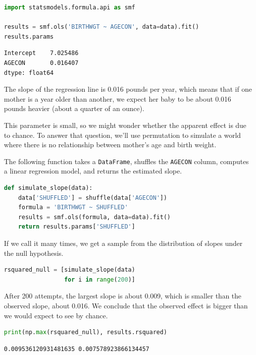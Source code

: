 \begin{lstlisting}[language=Python,style=source]
import statsmodels.formula.api as smf

results = smf.ols('BIRTHWGT ~ AGECON', data=data).fit()
results.params
\end{lstlisting}

\begin{lstlisting}[style=output]
Intercept    7.025486
AGECON       0.016407
dtype: float64
\end{lstlisting}

The slope of the regression line is 0.016 pounds per year, which means
that if one mother is a year older than another, we expect her baby to
be about 0.016 pounds heavier (about a quarter of an ounce).

This parameter is small, so we might wonder whether the apparent effect
is due to chance. To answer that question, we'll use permutation to
simulate a world where there is no relationship between mother's age and
birth weight.

The following function takes a \passthrough{\lstinline!DataFrame!},
shuffles the \passthrough{\lstinline!AGECON!} column, computes a linear
regression model, and returns the estimated slope.

\begin{lstlisting}[language=Python,style=source]
def simulate_slope(data):
    data['SHUFFLED'] = shuffle(data['AGECON'])
    formula = 'BIRTHWGT ~ SHUFFLED'
    results = smf.ols(formula, data=data).fit()
    return results.params['SHUFFLED']
\end{lstlisting}

If we call it many times, we get a sample from the distribution of
slopes under the null hypothesis.

\begin{lstlisting}[language=Python,style=source]
rsquared_null = [simulate_slope(data)
                 for i in range(200)]
\end{lstlisting}

After 200 attempts, the largest slope is about 0.009, which is smaller
than the observed slope, about 0.016. We conclude that the observed
effect is bigger than we would expect to see by chance.

\begin{lstlisting}[language=Python,style=source]
print(np.max(rsquared_null), results.rsquared)
\end{lstlisting}

\begin{lstlisting}[style=output]
0.009536120931481635 0.007578923866134457
\end{lstlisting}

